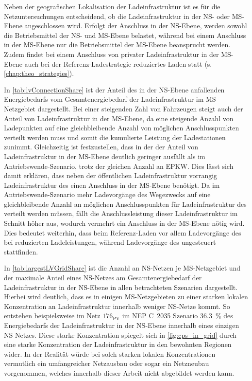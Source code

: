 Neben der geo­gra­fischen Lokalisation der Ladeinfrastruktur ist es für die Netzuntersuchungen entscheidend, ob die Ladeinfrastruktur in der \gls{NS}- oder \gls{MS}-Ebene angeschlossen wird.
Erfolgt der Anschluss in der \gls{NS}-Ebene, werden sowohl die Betriebsmittel der \gls{NS}- und \gls{MS}-Ebene belastet, während bei einem Anschluss in der \gls{MS}-Ebene nur die Betriebsmittel der \gls{MS}-Ebene beansprucht werden.
Zudem findet bei einem Anschluss von privater Ladeinfrastruktur in der \gls{MS}-Ebene auch bei der Referenz-Ladestrategie reduziertes Laden statt (s. \autoref{chap:theo_strategies}).



In \autoref{tab:lvConnectionShare} ist der Anteil des in der \gls{NS}-Ebene anfallenden Energiebedarfs vom Gesamtenergiebedarf der Ladeinfrastruktur im \gls{MS}-Netzgebiet dargestellt.
Bei einer steigenden Zahl von Fahrzeugen steigt auch der Anteil von Ladeinfrastruktur in der \gls{MS}-Ebene, da eine steigende Anzahl von Ladepunkten auf eine gleichbleibende Anzahl von möglichen Anschlusspunkten verteilt werden muss und somit die kumulierte Leistung der Ladestationen zunimmt.
Gleichzeitig ist festzustellen, dass in der \SzeFirmenparkplatz der Anteil von Ladeinfrastruktur in der \gls{MS}-Ebene deutlich geringer ausfällt als im Antriebswende-Szenario, trotz der gleichen Anzahl an \gls{EPKW}.
Dies lässt sich damit erklären, dass neben der öffentlichen Ladeinfrastruktur vorrangig Ladeinfrastruktur des \UC \Firmeparkplatz einen Anschluss in der \gls{MS}-Ebene benötigt.
Da im Antriebswende-Szenario mehr Ladevorgänge des Wegezwecks \Arbeit auf eine gleichbleibende Anzahl an möglichen Anschlusspunkten für Ladeinfrastruktur des \UC \Firmeparkplatz verteilt werden müssen, fällt die Anschlussleistung dieser Ladeinfrastruktur im Schnitt höher aus, wodurch vermehrt ein Anschluss in der \gls{MS}-Ebene nötig wird.
Dies bedeutet weiterhin, dass beim Referenz-Laden vor allem Ladevorgänge des \UC \Firmeparkplatz bei reduzierten Ladeleistungen, während Ladevorgänge des \UC \zH ungesteuert stattfinden.



In \autoref{tab:largestLVGridShare} ist die Anzahl an \gls{NS}-Netzen je \gls{MS}-Netzgebiet und der maximale Anteil eines \gls{NS}-Netzes am Gesamtenergiebedarf der Ladeinfrastruktur in der \gls{NS}-Ebene in allen betrachteten Szenarien dargestellt.
Hierbei wird deutlich, dass es in einigen \gls{MS}-Netzgebieten zu einer starken lokalen Konzentration an Ladeinfrastruktur innerhalb weniger \gls{NS}-Netze kommt.
So entstehen beispielsweise im Netz \(176_{\text{PV}}\) im \gls{NEP} C~\num{2035} Szenario \SI{36.3}{\percent} des Energiebedarfs der Ladeinfrastruktur in der \gls{NS}-Ebene innerhalb eines einzigen \gls{NS}-Netzes.
Diese starke Konzentration spiegelt sich in \autoref{fig:cps_in_grid} durch eine starke Konzentration der Ladeinfrastruktur in den bewohnten Regionen wider.
In der Realität würde bei solch starken lokalen Konzentrationen vermutlich ein umfangreicher Netzausbau oder sogar ein Netzneubau vorgenommen, welches innerhalb dieser Arbeit nicht abgebildet werden kann.


